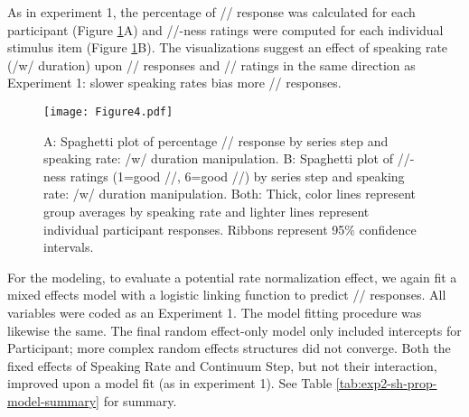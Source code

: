 \documentclass[preprint]{JASA}
\begin{document}
As in experiment 1, the percentage of /\textesh/ response was calculated for each participant (Figure \ref{fig:exp2-response-function}A) and /\textesh/-ness ratings were computed for each individual stimulus item (Figure \ref{fig:exp2-response-function}B). The visualizations suggest an effect of speaking rate (/w/ duration) upon /\textesh/ responses and /\textesh/ ratings in the same direction as Experiment 1: slower speaking rates bias more /\textteshlig/ responses.

\begin{figure}
\centering
\texttt{[image: Figure4.pdf]}
\caption{\label{fig:exp2-response-function}A: Spaghetti plot of percentage /\textesh/ response by series step and speaking rate: /w/ duration manipulation. B: Spaghetti plot of /\textesh/-ness ratings (1=good /\textesh/, 6=good /\textteshlig/) by series step and speaking rate: /w/ duration manipulation. Both: Thick, color lines represent group averages by speaking rate and lighter lines represent individual participant responses. Ribbons represent 95\% confidence intervals.}
\end{figure}

For the modeling, to evaluate a potential rate normalization effect, we again fit a mixed effects model with a logistic linking function to predict /\textesh/ responses. All variables were coded as an Experiment 1. The model fitting procedure was likewise the same. The final random effect-only model only included intercepts for Participant; more complex random effects structures did not converge. Both the fixed effects of Speaking Rate and Continuum Step, but not their interaction, improved upon a model fit (as in experiment 1). See Table \ref{tab:exp2-sh-prop-model-summary} for summary.

\end{document}
